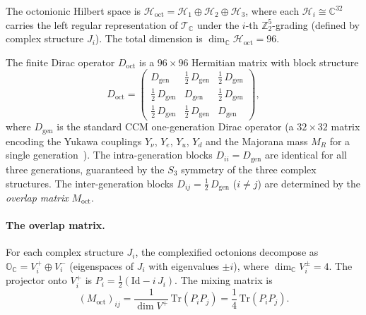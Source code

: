 The octonionic Hilbert space is $\mathcal{H}_{\mathrm{oct}} = \mathcal{H}_1 \oplus \mathcal{H}_2 \oplus \mathcal{H}_3$, where each $\mathcal{H}_i \cong \mathbb{C}^{32}$ carries the left regular representation of $\mathcal{T}_{\mathbb{C}}$ under the $i$-th $\mathbb{Z}_2^5$-grading (defined by complex structure $J_i$). The total dimension is $\dim_{\mathbb{C}} \mathcal{H}_{\mathrm{oct}} = 96$.

The finite Dirac operator $D_{\mathrm{oct}}$ is a $96 \times 96$ Hermitian matrix with block structure
\begin{equation}
  D_{\mathrm{oct}} = \begin{pmatrix}
    D_{\mathrm{gen}} & \tfrac{1}{2}\, D_{\mathrm{gen}} & \tfrac{1}{2}\, D_{\mathrm{gen}} \\[4pt]
    \tfrac{1}{2}\, D_{\mathrm{gen}} & D_{\mathrm{gen}} & \tfrac{1}{2}\, D_{\mathrm{gen}} \\[4pt]
    \tfrac{1}{2}\, D_{\mathrm{gen}} & \tfrac{1}{2}\, D_{\mathrm{gen}} & D_{\mathrm{gen}}
  \end{pmatrix},
  \label{eq:4-80}
\end{equation}
where $D_{\mathrm{gen}}$ is the standard CCM one-generation Dirac operator (a $32 \times 32$ matrix encoding the Yukawa couplings $Y_\nu$, $Y_e$, $Y_u$, $Y_d$ and the Majorana mass $M_R$ for a single generation~\cite{ch4:CCM2007,ch4:vanSuijlekom2024}). The intra-generation blocks $D_{ii} = D_{\mathrm{gen}}$ are identical for all three generations, guaranteed by the $S_3$ symmetry of the three complex structures. The inter-generation blocks $D_{ij} = \tfrac{1}{2}\, D_{\mathrm{gen}}$ ($i \neq j$) are determined by the \emph{overlap matrix} $M_{\mathrm{oct}}$.

\paragraph{The overlap matrix.}
For each complex structure $J_i$, the complexified octonions decompose as $\mathbb{O}_{\mathbb{C}} = V_i^+ \oplus V_i^-$ (eigenspaces of $J_i$ with eigenvalues $\pm i$), where $\dim_{\mathbb{C}} V_i^{\pm} = 4$. The projector onto $V_i^+$ is $P_i = \tfrac{1}{2}(\mathrm{Id} - i\, J_i)$. The mixing matrix is
\begin{equation}
  (M_{\mathrm{oct}})_{ij} = \frac{1}{\dim V^+}\, \mathrm{Tr}(P_i P_j) = \frac{1}{4}\, \mathrm{Tr}(P_i P_j).
  \label{eq:4-81}
\end{equation}

